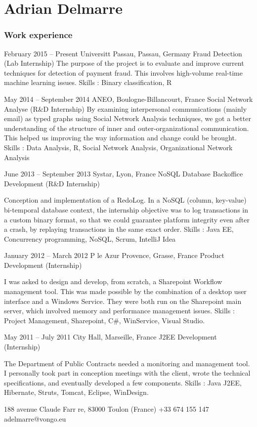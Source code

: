 \documentclass[fontsize=10pt]{tccv}
\begin{document}
\part{Adrian Delmarre}

\section{Work experience}

\begin{eventlist}

\item{February 2015 -- Present}
     {Universitt Passau, Passau, Germany}
     {Fraud Detection (Lab Internship)}
The purpose of the project is to evaluate and improve current techniques for detection of payment fraud. This involves high-volume real-time machine learning issues.
Skills : Binary classification, R
\item{May 2014 -- September 2014}
     {ANEO, Boulogne-Billancourt, France}
     {Social Network Analyse (R\&D Internship)}
By examining interpersonal communications (mainly email) as typed graphs using Social Network Analysis techniques, we got a better understanding of the structure of inner and outer-organizational communication. This helped us improving the way information and change could be brought.
Skills : Data Analysis, R, Social Network Analysis, Organizational Network Analysis
\item{June 2013 -- September 2013}
     {Systar, Lyon, France}
     {NoSQL Database Backoffice Development (R\&D Internship)}

Conception and implementation of a RedoLog.
In a NoSQL (column, key-value) bi-temporal database context, the internship objective was to log transactions in a custom binary format, so that we could guarantee platform integrity even after a crash, by replaying transactions in the same exact order.
Skills : Java EE, Concurrency programming, NoSQL, Scrum, IntelliJ Idea
\item{January 2012 -- March 2012}
     {P le Azur Provence, Grasse, France}
     {Product Development (Internship)}

I was asked to design and develop, from scratch, a Sharepoint Workflow management tool. This was made possible by the combination of a desktop user interface and a Windows Service. They were both run on the Sharepoint main server, which involved memory and performance management issues.
Skills : Project Management, Sharepoint, C\#, WinService, Visual Studio.
\item{May 2011 -- July 2011}
     {City Hall, Marseille, France}
     {J2EE Development (Internship)}

The Department of Public Contracts needed a monitoring and management tool.
I personally took part in conception meetings with the client, wrote the technical specifications, and eventually developed a few components.
Skills : Java J2EE, Hibernate, Struts, Tomcat, Eclipse, WinDesign.
\end{eventlist}
\personal
     {}
     {188 avenue Claude Farr re, 83000 Toulon (France)}
     {+33 674 155 147}
     {adelmarre@vongo.eu}
\end{document}
